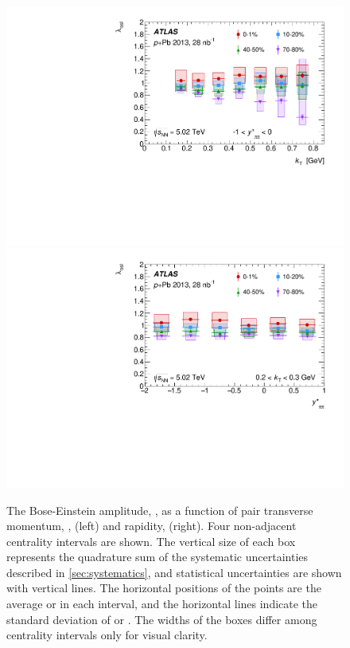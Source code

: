 \begin{figure}[ht]
\centering
\includegraphics[width=0.49\linewidth]{canqosl_x_vs_kt.pdf}
\includegraphics[width=0.49\linewidth]{canqosl_x_vs_kys.pdf}
\caption{The Bose-Einstein amplitude, \losl, as a function of pair transverse momentum, \kt, (left) and rapidity, \kys (right). Four non-adjacent centrality intervals are shown. The vertical size of each box represents the quadrature sum of the systematic uncertainties described in \cref{sec:systematics}, and statistical uncertainties are shown with vertical lines. The horizontal positions of the points are the average \kt or \kys in each interval, and the horizontal lines indicate the standard deviation of \kt or \kys. The widths of the boxes differ among centrality intervals only for visual clarity.}
\label{fig:results_qosl_x}
\end{figure}


